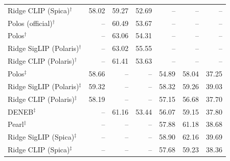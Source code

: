 \begin{tabular}{lrrrrrr}
Ridge CLIP (Spica)$^{\dagger}$ & 58.02 & 59.27 & 52.69 & -- & -- & -- \\
Polos (official)$^{\dagger}$ & -- & 60.49 & 53.67 & -- & -- & -- \\
Polos$^{\dagger}$ & -- & 63.06 & 54.31 & -- & -- & -- \\
Ridge SigLIP (Polaris)$^{\dagger}$ & -- & 63.02 & 55.55 & -- & -- & -- \\
Ridge CLIP (Polaris)$^{\dagger}$ & -- & 61.41 & 53.63 & -- & -- & -- \\
\addlinespace
Polos$^{\ddagger}$ & 58.66 & -- & -- & 54.89 & 58.04 & 37.25 \\
Ridge SigLIP (Polaris)$^{\ddagger}$ & 59.32 & -- & -- & 58.32 & 59.26 & 39.03 \\
Ridge CLIP (Polaris)$^{\ddagger}$ & 58.19 & -- & -- & 57.15 & 56.68 & 37.70 \\
DENEB$^{\ddagger}$ & -- & 61.16 & 53.44 & 56.07 & 59.15 & 37.80 \\
Pearl$^{\ddagger}$ & -- & -- & -- & 57.88 & 61.18 & 38.68 \\
Ridge SigLIP (Spica)$^{\ddagger}$ & -- & -- & -- & 58.90 & 62.16 & 39.69 \\
Ridge CLIP (Spica)$^{\ddagger}$ & -- & -- & -- & 57.68 & 59.23 & 38.36 \\
\bottomrule
\end{tabular}

